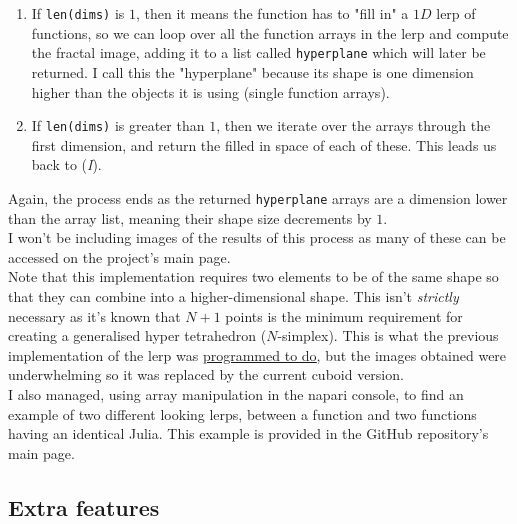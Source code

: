 \documentclass{article}
\begin{document}
\begin{enumerate}[label=(\textit{\Roman*})]
\item If \texttt{len(dims)} is $1$, then it means the function has to "fill in" a $1D$ lerp of functions, so we can loop over all the function arrays in the lerp and compute the fractal image, adding it to a list called \texttt{hyperplane} which will later be returned. I call this the "hyperplane" because its shape is one dimension higher than the objects it is using (single function arrays). \\
\item If \texttt{len(dims)} is greater than $1$, then we iterate over the arrays through the first dimension, and return the filled in space of each of these. This leads us back to (\textit{I}).
\end{enumerate}

Again, the process ends as the returned \texttt{hyperplane} arrays are a dimension lower than the array list, meaning their shape size decrements by $1$. \\
\vspace{5mm}
I won't be including images of the results of this process as many of these can be accessed on the project's main page. \\
\vspace{2mm}
Note that this implementation requires two elements to be of the same shape so that they can combine into a higher-dimensional shape. This isn't \textit{strictly} necessary as it's known that $N+1$ points is the minimum requirement for creating a generalised hyper tetrahedron ($N$-simplex). This is what the previous implementation of the lerp was \textcolor{blue}{\underline{\href{https://github.com/ChrisMzz/fractal-art/commit/969f2b91422a85f62373049e1803790af383be2d\#commitcomment-125562036}{programmed to do}}}, but the images obtained were underwhelming so it was replaced by the current cuboid version. \\
\vspace{2mm}
I also managed, using array manipulation in the napari console, to find an example of two different looking lerps, between a function and two functions having an identical Julia. This example is provided in the GitHub repository's main page. \\
\vspace{2mm}

\subsection{Extra features}
\end{document}
